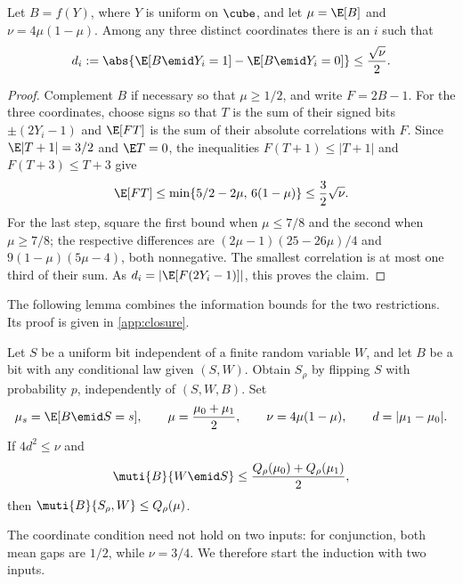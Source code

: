 \begin{lemma}\label{lem:coordinate-gap}
Let $B=f(Y)$, where $Y$ is uniform on $\cube$, and let
$\mu=\E[B]$ and $\nu=4\mu(1-\mu)$. Among any three distinct
coordinates there is an $i$ such that
\[
 d_i:=\abs{\E[B\emid Y_i=1]-\E[B\emid Y_i=0]}
 \le \frac{\sqrt\nu}{2}.
\]
\end{lemma}
\begin{proof}
Complement $B$ if necessary so that $\mu\ge1/2$, and write $F=2B-1$.
For the three coordinates, choose signs so that
$T$ is the sum of their signed bits $\pm(2Y_i-1)$ and
$\E[FT]$ is the sum of their absolute correlations with $F$.
Since $\E|T+1|=3/2$ and $\E T=0$, the inequalities
$F(T+1)\le|T+1|$ and $F(T+3)\le T+3$ give
\[
 \E[FT]\le\min\{5/2-2\mu,\,6(1-\mu)\}
 \le\frac32\sqrt\nu.
\]
For the last step, square the first bound when $\mu\le7/8$
and the second when $\mu\ge7/8$; the respective differences are
$(2\mu-1)(25-26\mu)/4$ and $9(1-\mu)(5\mu-4)$, both nonnegative.
The smallest correlation is at most one third of their sum.
As $d_i=|\E[F(2Y_i-1)]|$, this proves the claim.
\end{proof}

The following lemma combines the information bounds for the two
restrictions. Its proof is given in \autoref{app:closure}.

\begin{lemma}\label{lem:closure}
Let $S$ be a uniform bit independent of a finite random variable
$W$, and let $B$ be a bit with any conditional law given $(S,W)$.
Obtain $S_\rho$ by flipping $S$ with probability $p$, independently
of $(S,W,B)$. Set
\[
 \mu_s=\E[B\emid S=s],\qquad
 \mu=\frac{\mu_0+\mu_1}{2},\qquad \nu=4\mu(1-\mu),\qquad d=|\mu_1-\mu_0|.
\]
If $4d^2\le\nu$ and
\begin{equation}\label{eq:child-information}
 \muti{B}{W\emid S}
 \le\frac{Q_\rho(\mu_0)+Q_\rho(\mu_1)}2,
\end{equation}
then $\muti{B}{S_\rho,W}\le Q_\rho(\mu)$.
\end{lemma}

The coordinate condition need not hold on two inputs: for conjunction,
both mean gaps are $1/2$, while $\nu=3/4$. We therefore start the
induction with two inputs.

